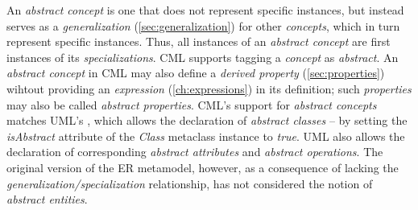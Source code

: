 \begin{definition}
An \emph{abstract concept} is one that does not represent specific instances,
but instead serves as a \emph{generalization} (\ref{sec:generalization}) 
for other \emph{concepts},
which in turn represent specific instances.
Thus, all instances of an \emph{abstract concept}
are first instances of its \emph{specializations}.
CML supports tagging a \emph{concept} as \emph{abstract}.
An \emph{abstract concept} in CML may also define a \emph{derived property} (\ref{sec:properties})
wihtout providing an \emph{expression} (\ref{ch:expressions}) in its definition;
such \emph{properties} may also be called \emph{abstract properties}.
CML's support for \emph{abstract concepts} matches UML's \cite{uml},
which allows the declaration of \emph{abstract classes}
-- by setting the \emph{isAbstract} attribute of the \emph{Class} metaclass instance to \emph{true}.
UML also allows the declaration of corresponding \emph{abstract attributes} and \emph{abstract operations}.
The original version of the ER \cite{er} metamodel, however,
as a consequence of lacking the \emph{generalization/specialization} relationship,
has not considered the notion of \emph{abstract entities}.
\end{definition}